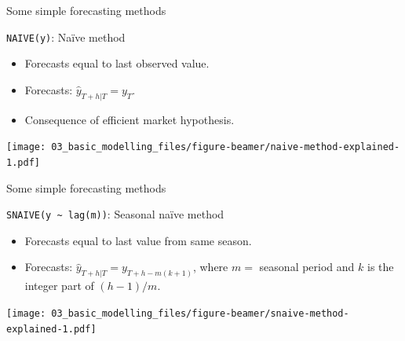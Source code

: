\documentclass[
  14pt,
  ignorenonframetext,
  aspectratio=169,
]{beamer}
\providecommand{\tightlist}{%
  \setlength{\itemsep}{0pt}\setlength{\parskip}{0pt}}\usepackage{longtable,booktabs,array}
\begin{document}
\begin{frame}[fragile]{Some simple forecasting methods}
\protect\hypertarget{some-simple-forecasting-methods-4}{}
\fontsize{13}{14}\sf

\begin{block}{\texttt{NAIVE(y)}: Naïve method}
\protect\hypertarget{naivey-nauxefve-method}{}
\begin{itemize}
\tightlist
\item
  Forecasts equal to last observed value.
\item
  Forecasts: \(\hat{y}_{T+h|T} =y_T\).
\item
  Consequence of efficient market hypothesis.
\end{itemize}

\texttt{[image: 03\_basic\_modelling\_files/figure-beamer/naive-method-explained-1.pdf]}
\end{block}
\end{frame}

\begin{frame}[fragile]{Some simple forecasting methods}
\protect\hypertarget{some-simple-forecasting-methods-5}{}
\fontsize{13}{14}\sf

\begin{block}{\texttt{SNAIVE(y\ \textasciitilde{}\ lag(m))}: Seasonal
naïve method}
\protect\hypertarget{snaivey-lagm-seasonal-nauxefve-method}{}
\begin{itemize}
\tightlist
\item
  Forecasts equal to last value from same season.
\item
  Forecasts: \(\hat{y}_{T+h|T} =y_{T+h-m(k+1)}\), where \(m=\) seasonal
  period and \(k\) is the integer part of \((h-1)/m\).
\end{itemize}

\texttt{[image: 03\_basic\_modelling\_files/figure-beamer/snaive-method-explained-1.pdf]}
\end{block}
\end{frame}
\end{document}
